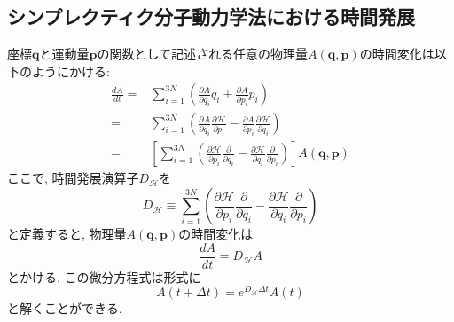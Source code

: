 \subsection{シンプレクティク分子動力学法における時間発展}
座標$\bm{q}$と運動量$\bm{p}$の関数として記述される任意の物理量$A(\bm{q}, \bm{p})$の時間変化は以下のようにかける:
\begin{align}
  \frac{dA}{dt}
  =&
  \sum_{i=1}^{3N}
  \left(
    \frac{\partial A}{\partial q_{i}} \dot{q}_{i}
    +
    \frac{\partial A}{\partial p_{i}} \dot{p}_{i}
  \right)
  \\
  =&
  \sum_{i=1}^{3N}
  \left(
    \frac{\partial A}{\partial q_{i}}
    \frac{\partial \mathcal{H}}{\partial p_{i}}
    -
    \frac{\partial A}{\partial p_{i}}
    \frac{\partial \mathcal{H}}{\partial q_{i}}
  \right)
  \\
  =&
  \left[
    \sum_{i=1}^{3N}
    \left(
      \frac{\partial \mathcal{H}}{\partial p_{i}}
      \frac{\partial}{\partial q_{i}}
      -
      \frac{\partial \mathcal{H}}{\partial q_{i}}
      \frac{\partial}{\partial p_{i}}
    \right)
  \right]
  A(\bm{q},\bm{p})
\end{align}
ここで, 時間発展演算子$D_{\mathcal{H}}$を
\begin{equation}
  D_{\mathcal{H}}
  \equiv
  \sum_{i=1}^{3N}
  \left(
    \frac{\partial \mathcal{H}}{\partial p_{i}}
    \frac{\partial}{\partial q_{i}}
    -
    \frac{\partial \mathcal{H}}{\partial q_{i}}
    \frac{\partial}{\partial p_{i}}
  \right)
\end{equation}
と定義すると, 物理量$A(\bm{q}, \bm{p})$の時間変化は
\begin{equation}
  \frac{dA}{dt}
  =
  D_{\mathcal{H}} A
\end{equation}
とかける. この微分方程式は形式に
\begin{equation}
  A(t + \Delta t)
  =
  e^{D_{\mathcal{H}} \Delta t} A(t)
\end{equation}
と解くことができる. 

